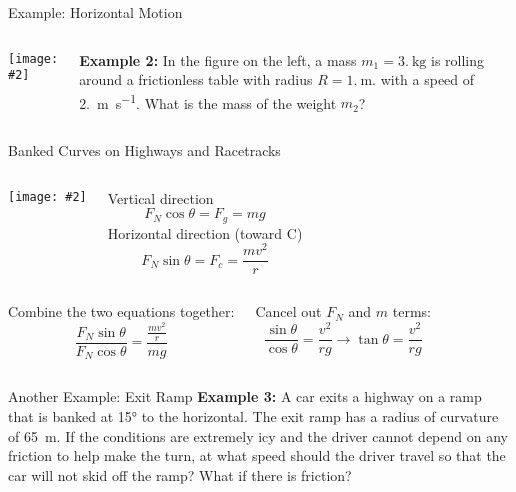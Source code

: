 \documentclass[12pt,compress,aspectratio=169]{beamer}
\newcommand{\pic}[2]{\texttt{[image: \#2]}}
\begin{document}
\begin{frame}{Example: Horizontal Motion}
  \begin{columns}
    \pic{1}{puck-on-table.png}
    
    \textbf{Example 2:} In the figure on the left, a mass
    $m_1=\SI{3.}{\kilo\gram}$ is rolling around a frictionless table with
    radius $R=\SI{1.}{\metre}$. with a speed of \SI{2.}{\metre\per\second}.
    What is the mass of the weight $m_2$?
  \end{columns}
\end{frame}



\begin{frame}{Banked Curves on Highways and Racetracks}
  \begin{columns}
    \pic{1}{banking.png}
    
    Vertical direction
    \begin{displaymath}
      F_N\cos\theta=F_g=mg
    \end{displaymath}
    Horizontal direction (toward C)
    \begin{displaymath}
      F_N\sin\theta=F_c=\frac{mv^2}{r}
    \end{displaymath}
  \end{columns}
  \pause
  \begin{columns}
    Combine the two equations together:
    \begin{displaymath}
      \frac{F_N\sin\theta}{F_N\cos\theta}=\frac{\frac{mv^2}{r}}{mg}
    \end{displaymath}
    
    Cancel out $F_N$ and $m$ terms:
    \begin{displaymath}
      \frac{\sin\theta}{\cos\theta}=\frac{v^2}{rg}\longrightarrow
      \boxed{\tan\theta=\frac{v^2}{rg}}
    \end{displaymath}
  \end{columns}
\end{frame}



\begin{frame}{Another Example: Exit Ramp}
  \textbf{Example 3:} A car exits a highway on a ramp that is banked at
  \ang{15} to the horizontal. The exit ramp has a radius of curvature of
  \SI{65}{\metre}. If the conditions are extremely icy and the driver cannot
  depend on any friction to help make the turn, at what speed should the driver
  travel so that the car will not skid off the ramp? What if there is friction?
\end{frame}
\end{document}

